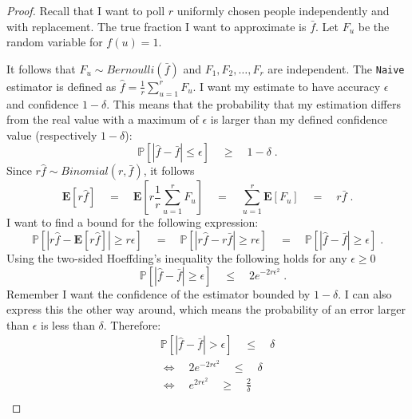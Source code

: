 \begin{proof}
Recall that I want to poll $r$ uniformly chosen people independently and with replacement. The true fraction I want to approximate is $\bar{f}$. Let $F_u$ be the random variable for $f(u) = 1$.

It follows that $F_u \sim  Bernoulli(\bar{f})$ and $F_1, F_2, \ldots , F_r$ are independent.
The \texttt{Naive} estimator is defined as $\hat{f} = \frac{1}{r}\sum_{u=1}^{r} F_u$.
I want my estimate to have accuracy $\epsilon$ and confidence $1-\delta$. This means that the probability that my estimation differs from the real value with a maximum of $\epsilon$ is larger than my defined confidence value (respectively $1-\delta$):
$$\mathds{P}[|\hat{f}-\bar{f} | \leq \epsilon] \quad\geq\quad 1-\delta \;.$$
Since $r\hat{f} \sim Binomial(r,\bar{f})$, it follows
$$\textbf{E}[r\hat{f}] \quad=\quad \textbf{E}[r\frac{1}{r}\sum_{u=1}^{r} F_u] \quad=\quad \sum_{u=1}^{r}\textbf{E}[F_u] \quad=\quad r\bar{f}\;.$$
I want to find a bound for the following expression:
$$\mathds{P}[|r\hat{f}-\textbf{E}[r\hat{f}]| \geq r\epsilon] \quad=\quad \mathds{P}[|r\hat{f}-r\bar{f}| \geq r\epsilon] \quad=\quad \mathds{P}[|\hat{f}-\bar{f}| \geq \epsilon]\;.$$ 
Using the two-sided Hoeffding's inequality the following holds for any $\epsilon \geq 0$
$$\quad \mathds{P}[|\hat{f}-\bar{f}|\geq \epsilon] \quad\leq\quad 2e^{-2r\epsilon^2}\;.$$
Remember I want the confidence of the estimator bounded by $1-\delta$. I can also express this the other way around, which means the probability of an error larger than $\epsilon$ is less than $\delta$.
Therefore:
\begin{align*}
\quad&\mathds{P}[|\hat{f}-\bar{f} | > \epsilon] \quad\leq\quad \delta\\
&\Leftrightarrow\quad2e^{-2r\epsilon^2} \quad\leq\quad \delta\\
&\Leftrightarrow\quad e^{2r\epsilon^2} \quad\geq\quad \frac{2}{\delta}\\

\end{align*}
\end{proof}
